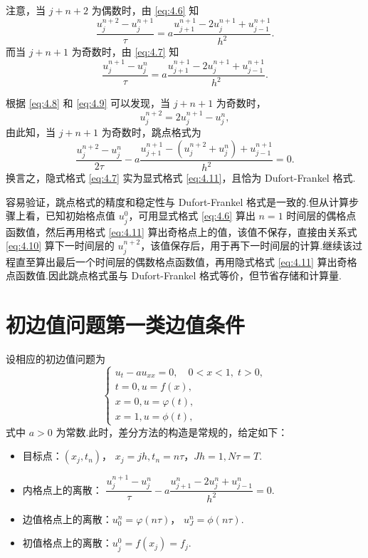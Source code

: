     注意，当 $j+n+2$ 为偶数时，由 \eqref{eq:4.6} 知
        \begin{equation}\label{eq:4.8}
            \frac{u_j^{n+2}-u_j^{n+1}}{\tau}=a\frac{u_{j+1}^{n+1}-2u_j^{n+1}+u_{j-1}^{n+1}}{h^2}.
        \end{equation}
        而当 $j+n+1$ 为奇数时，由 \eqref{eq:4.7} 知
        \begin{equation}\label{eq:4.9}
            \frac{u_j^{n+1}-u_j^n}{\tau}=a\frac{u_{j+1}^{n+1}-2u_j^{n+1}+u_{j-1}^{n+1}}{h^2}.
        \end{equation}

    根据 \eqref{eq:4.8} 和 \eqref{eq:4.9} 可以发现，当 $j+n+1$ 为奇数时，
    \begin{equation}\label{eq:4.10}
        u_j^{n+2}=2u_j^{n+1}-u_j^n,
    \end{equation}
    由此知，当 $j+n+1$ 为奇数时，跳点格式为
    \begin{equation}\label{eq:4.11}
        \frac{u_j^{n+2}-u_j^n}{2\tau}-a\frac{u_{j+1}^{n+1}-(u_j^{n+2}+u_j^n)+u_{j-1}^{n+1}}{h^2}=0.
    \end{equation}
    换言之，隐式格式 \eqref{eq:4.7} 实为显式格式 \eqref{eq:4.11}，且恰为 Dufort-Frankel 格式.

    \begin{conclusion}[小节]
        容易验证，跳点格式的精度和稳定性与 Dufort-Frankel 格式是一致的.但从计算步骤上看，已知初始格点值 $u_j^0$，可用显式格式 \eqref{eq:4.6} 算出 $n=1$ 时间层的偶格点函数值，然后再用格式 \eqref{eq:4.11} 算出奇格点上的值，该值不保存，直接由关系式 \eqref{eq:4.10} 算下一时间层的 $u_j^{n+2}$，该值保存后，用于再下一时间层的计算.继续该过程直至算出最后一个时间层的偶数格点函数值，再用隐式格式 \eqref{eq:4.11} 算出奇格点函数值.因此跳点格式虽与 Dufort-Frankel 格式等价，但节省存储和计算量.
    \end{conclusion}


\section{初边值问题第一类边值条件}

设相应的初边值问题为
\begin{equation}
    \begin{cases}
        u_t - au_{xx} = 0, \quad 0 < x < 1, \; t > 0, \\
        t=0, u = f(x), \\
        x=0, u = \varphi(t), \\
        x=1, u = \phi(t),
    \end{cases}
\end{equation}
式中 $a > 0$ 为常数.此时，差分方法的构造是常规的，给定如下：
\begin{itemize}
    \item 目标点：$(x_j, t_n)$， $x_j = jh, t_n = n\tau$，$Jh = 1, N\tau = T$.
    \item 内格点上的离散： $\dfrac{u_j^{n+1} - u_j^n}{\tau} - a \dfrac{u_{j+1}^n - 2u_j^n + u_{j-1}^n}{h^2} = 0$.
    \item 边值格点上的离散：$u_0^n = \varphi(n\tau)$， $u_J^n = \phi(n\tau)$.
    \item 初值格点上的离散：$u_j^0 = f(x_j) = f_j$.
\end{itemize}


